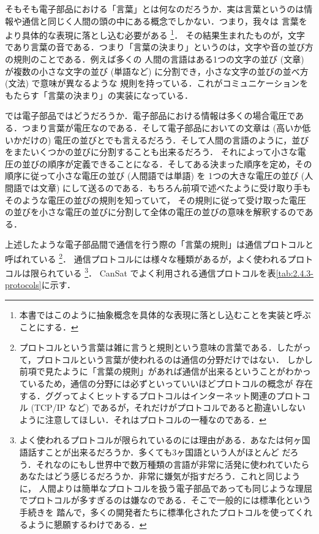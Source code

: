 \documentclass[dvipdfmx]{jsbook}
\begin{document}
  そもそも電子部品における「言葉」とは何なのだろうか．実は言葉というのは情報や通信と同じく人間の頭の中にある概念でしかない．つまり，我々は
  言葉をより具体的な表現に落とし込む必要がある
  \footnote{本書ではこのように抽象概念を具体的な表現に落とし込むことを実装と呼ぶことにする．}．
  その結果生まれたものが，文字であり言葉の音である．つまり「言葉の決まり」というのは，文字や音の並び方の規則のことである．例えば多くの
  人間の言語はある1つの文字の並び (文章) が複数の小さな文字の並び (単語など) に分割でき，小さな文字の並びの並べ方 (文法) で意味が異なるような
  規則を持っている．これがコミュニケーションをもたらす「言葉の決まり」の実装になっている．

  では電子部品ではどうだろうか．電子部品における情報は多くの場合電圧である．つまり言葉が電圧なのである．そして電子部品においての文章は
  (高いか低いかだけの) 電圧の並びとでも言えるだろう．そして人間の言語のように，並びをまたいくつかの並びに分割することも出来るだろう．
  それによって小さな電圧の並びの順序が定義できることになる．そしてある決まった順序を定め，その順序に従って小さな電圧の並び (人間語では単語) を
  1つの大きな電圧の並び (人間語では文章) にして送るのである．もちろん前項で述べたように受け取り手もそのような電圧の並びの規則を知っていて，
  その規則に従って受け取った電圧の並びを小さな電圧の並びに分割して全体の電圧の並びの意味を解釈するのである．

  上述したような電子部品間で通信を行う際の「言葉の規則」は通信プロトコルと呼ばれている
  \footnote{プロトコルという言葉は雑に言うと規則という意味の言葉である．したがって，プロトコルという言葉が使われるのは通信の分野だけではない．
  しかし前項で見たように「言葉の規則」があれば通信が出来るということがわかっているため，通信の分野には必ずといっていいほどプロトコルの概念が
  存在する．ググってよくヒットするプロトコルはインターネット関連のプロトコル (TCP/IP など) であるが，それだけがプロトコルであると勘違いしない
  ように注意してほしい．それはプロトコルの一種なのである．}．
  通信プロトコルには様々な種類があるが，よく使われるプロトコルは限られている
  \footnote{よく使われるプロトコルが限られているのには理由がある．あなたは何ヶ国語話すことが出来るだろうか．多くても3ヶ国語という人がほとんど
  だろう．それなのにもし世界中で数万種類の言語が非常に活発に使われていたらあなたはどう感じるだろうか．非常に嫌気が指すだろう．これと同じように，
  人間よりは簡単なプロトコルを扱う電子部品であっても同じような理屈でプロトコルが多すぎるのは嫌なのである．そこで一般的には標準化という手続きを
  踏んで，多くの開発者たちに標準化されたプロトコルを使ってくれるように懇願するわけである．}．
  CanSat でよく利用される通信プロトコルを表\ref{tab:2.4.3-protocols}に示す．
\end{document}
